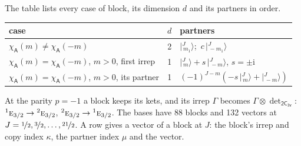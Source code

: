 \documentclass[10pt,a4paper]{article}
\numberwithin{equation}{section}
\newcommand{\grp}[1]{\mathsf{#1}}
\newcommand{\irr}[1]{\text{\normalfont\scshape #1}}
\newcommand{\conjpair}[1]{{}^{#1}}
\newcommand{\iunit}{\mathrm{i}}
\newcommand{\chiA}{\chi_{\grp{A}}}
\newcommand{\irrprod}{\otimes}
\newcommand{\mult}{\kappa}
\newcommand{\intx}{\mu}
\newcommand{\jm}[2]{\bigl\lvert{}^{#1}_{\,#2}\bigr\rangle}
\begin{document}
\leavevmode\label{n:head.case}\label{n:head.partners}The table lists every case of block, its dimension $d$ and its partners in order.
\begin{center}\begin{tabular}{@{}lrl@{}}\toprule
case & $d$ & partners\\\midrule
$\chiA(m) \ne \chiA(-m)$ & 2 & $\jm{J}{m_1}$;\ $c\,\jm{J}{-m_1}$\\
$\chiA(m) = \chiA(-m)$, $m > 0$, first irrep & 1 & $\jm{J}{m} + s\,\jm{J}{-m}$, $s = \pm\iunit$\\
$\chiA(m) = \chiA(-m)$, $m > 0$, its partner & 1 & $(-1)^{J-m}(-s\,\jm{J}{m} + \jm{J}{-m})$\\
\bottomrule\end{tabular}\end{center}
\leavevmode\label{n:operator.determinant.character}At the parity $p = -1$ a block keeps its kets, and its irrep $\Gamma$ becomes $\Gamma \irrprod \det_{\grp{2C_{3v}}}$: $\conjpair{1}\irr{e}_{3/2} \to \conjpair{2}\irr{e}_{3/2}$, $\conjpair{2}\irr{e}_{3/2} \to \conjpair{1}\irr{e}_{3/2}$.
The bases have 88 blocks and 132 vectors at $J = \nicefrac{1}{2}, \nicefrac{3}{2}, \dots, \nicefrac{21}{2}$. \label{n:head.vector}A row gives a vector of a block at $J$: the block's irrep and copy index $\mult$, the partner index $\intx$ and the vector.
\end{document}
